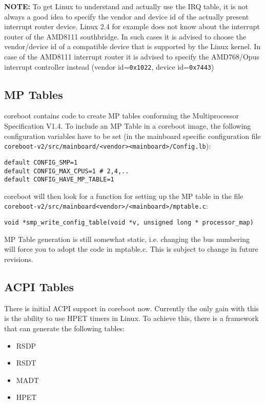 \documentclass[titlepage,12pt]{article}
\begin{document}
\textbf{NOTE:} To get Linux to understand and actually use the IRQ
table, it is not always a good idea to specify the vendor and device id
of the actually present interrupt router device. Linux 2.4 for example
does not know about the interrupt router of the AMD8111 southbridge. In
such cases it is advised to choose the vendor/device id of a compatible
device that is supported by the Linux kernel. In case of the AMD8111
interrupt router it is advised to specify the AMD768/Opus interrupt
controller instead (vendor id=\texttt{0x1022}, device id=\texttt{0x7443})

\subsection {MP Tables}

coreboot contains code to create MP tables conforming the
Multiprocessor Specification V1.4. To include an MP Table in a coreboot
image, the following configuration variables have to be set (in the
mainboard specific configuration file
\texttt{coreboot-v2/src/mainboard/<vendor><mainboard>/Config.lb}):

\begin{verbatim}
default CONFIG_SMP=1
default CONFIG_MAX_CPUS=1 # 2,4,..
default CONFIG_HAVE_MP_TABLE=1
\end{verbatim}

coreboot will then look for a function for setting up the MP table in
the file \texttt{coreboot-v2/src/mainboard<vendor>/<mainboard>/mptable.c}:

\begin{verbatim}
void *smp_write_config_table(void *v, unsigned long * processor_map)
\end{verbatim}

MP Table generation is still somewhat static, i.e. changing the bus
numbering will force
you to adopt the code in mptable.c. This is subject to change in future
revisions.

\subsection {ACPI Tables}

There is initial ACPI support in coreboot now. Currently the only gain with
this is the ability to use HPET timers in Linux. To achieve this, there is a
framework that can generate the following tables: 
\begin{itemize}
\item RSDP
\item RSDT
\item MADT
\item HPET
\end{itemize}
\end{document}
